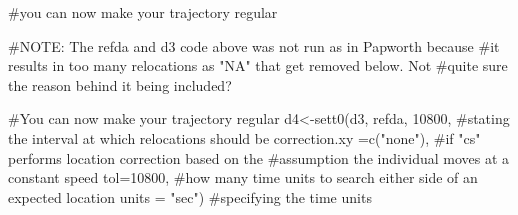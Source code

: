 \documentclass[
  letterpaper,
]{book}
\newenvironment{Shaded}{\begin{snugshade}}{\end{snugshade}}
\newcommand{\AttributeTok}[1]{\textcolor[rgb]{0.40,0.45,0.13}{#1}}
\newcommand{\CommentTok}[1]{\textcolor[rgb]{0.37,0.37,0.37}{#1}}
\newcommand{\DecValTok}[1]{\textcolor[rgb]{0.68,0.00,0.00}{#1}}
\newcommand{\FunctionTok}[1]{\textcolor[rgb]{0.28,0.35,0.67}{#1}}
\newcommand{\NormalTok}[1]{\textcolor[rgb]{0.00,0.23,0.31}{#1}}
\newcommand{\OtherTok}[1]{\textcolor[rgb]{0.00,0.23,0.31}{#1}}
\newcommand{\StringTok}[1]{\textcolor[rgb]{0.13,0.47,0.30}{#1}}
\begin{document}
\begin{Shaded}
\begin{Highlighting}[]
\CommentTok{\#you can now make your trajectory regular }

\CommentTok{\#NOTE: The refda and d3 code above was not run as in Papworth because }
\CommentTok{\#it results in too many relocations as "NA" that get removed below. Not }
\CommentTok{\#quite sure the reason behind it being included?}

\CommentTok{\#You can now make your trajectory regular }
\NormalTok{d4}\OtherTok{\textless{}{-}}\FunctionTok{sett0}\NormalTok{(d3, refda, }
\DecValTok{10800}\NormalTok{,                         }\CommentTok{\#stating the interval at which relocations should be}
\AttributeTok{correction.xy =}\FunctionTok{c}\NormalTok{(}\StringTok{"none"}\NormalTok{),   }\CommentTok{\#if "cs" performs location correction based on the }
\CommentTok{\#assumption the individual moves at a constant speed }
\AttributeTok{tol=}\DecValTok{10800}\NormalTok{,       }\CommentTok{\#how many time units to search either side of an expected location}
\AttributeTok{units =} \StringTok{"sec"}\NormalTok{)  }\CommentTok{\#specifying the time units}
                              

\end{Highlighting}
\end{Shaded}
\end{document}
